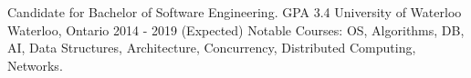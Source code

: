 


\begin{cventries}


\cventry
{Candidate for Bachelor of Software Engineering. GPA 3.4} %
{University of Waterloo}
{Waterloo, Ontario} %
    {2014 - 2019 (Expected)} %
{ %
    Notable Courses: OS, Algorithms, DB, AI, Data Structures, Architecture, Concurrency, Distributed Computing, Networks.
}


\end{cventries}
